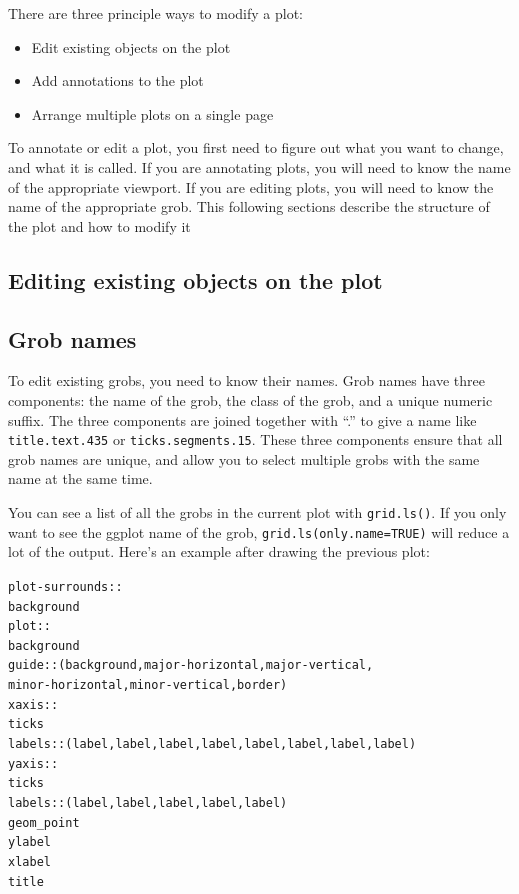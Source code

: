There are three principle ways to modify a plot:

\begin{itemize}
  \item Edit existing objects on the plot
  \item Add annotations to the plot
  \item Arrange multiple plots on a single page
\end{itemize}

To annotate or edit a plot, you first need to figure out what you want to change, and what it is called.  If you are annotating plots, you will need to know the name of the appropriate viewport.  If you are editing plots, you will need to know the name of the appropriate grob.  This following sections describe the structure of the plot and how to modify it

\subsection{Editing existing objects on the plot}

\subsection{Grob names}

To edit existing grobs, you need to know their names.  Grob names have three components: the name of the grob, the class of the grob, and a unique numeric suffix.  The three components are joined together with ``.'' to give a name like {\tt title.text.435} or {\tt ticks.segments.15}.  These three components ensure that all grob names are unique, and allow you to select multiple grobs with the same name at the same time.


You can see a list of all the grobs in the current plot with {\tt grid.ls()}.  If you only want to see the ggplot name of the grob, {\tt grid.ls(only.name=TRUE)} will reduce a lot of the output.  Here's an example after drawing the previous plot:

\begin{alltt}
plot-surrounds::
 background
 plot::
  background
  guide:: (background, major-horizontal, major-vertical, 
           minor-horizontal, minor-vertical, border)
  xaxis::
   ticks
   labels:: (label, label, label, label, label, label, label, label)
  yaxis::
   ticks
   labels:: (label, label, label, label, label)
  geom_point
 ylabel
 xlabel
 title
\end{alltt}

